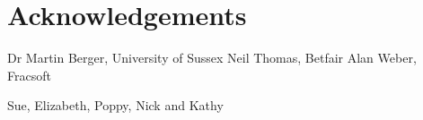 \chapter{Acknowledgements}

Dr Martin Berger, University of Sussex
Neil Thomas, Betfair
Alan Weber, Fracsoft

Sue, Elizabeth, Poppy, Nick and Kathy

